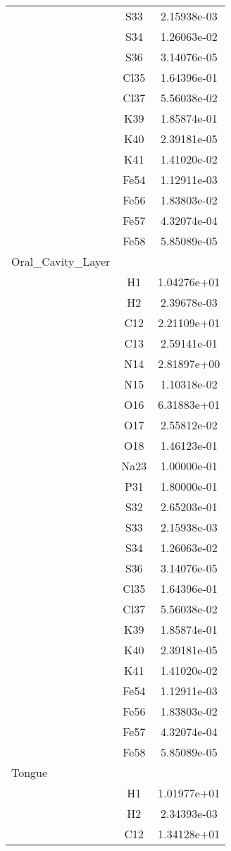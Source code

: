 \begin{centering}
\begin{longtable}{l c c}
& S33 & 2.15938e-03 \\ 
& S34 & 1.26063e-02 \\ 
& S36 & 3.14076e-05 \\ 
& Cl35 & 1.64396e-01 \\ 
& Cl37 & 5.56038e-02 \\ 
& K39 & 1.85874e-01 \\ 
& K40 & 2.39181e-05 \\ 
& K41 & 1.41020e-02 \\ 
& Fe54 & 1.12911e-03 \\ 
& Fe56 & 1.83803e-02 \\ 
& Fe57 & 4.32074e-04 \\ 
& Fe58 & 5.85089e-05 \\ 
\hline
Oral\_Cavity\_Layer & & \\
\hline
& H1 & 1.04276e+01 \\ 
& H2 & 2.39678e-03 \\ 
& C12 & 2.21109e+01 \\ 
& C13 & 2.59141e-01 \\ 
& N14 & 2.81897e+00 \\ 
& N15 & 1.10318e-02 \\ 
& O16 & 6.31883e+01 \\ 
& O17 & 2.55812e-02 \\ 
& O18 & 1.46123e-01 \\ 
& Na23 & 1.00000e-01 \\ 
& P31 & 1.80000e-01 \\ 
& S32 & 2.65203e-01 \\ 
& S33 & 2.15938e-03 \\ 
& S34 & 1.26063e-02 \\ 
& S36 & 3.14076e-05 \\ 
& Cl35 & 1.64396e-01 \\ 
& Cl37 & 5.56038e-02 \\ 
& K39 & 1.85874e-01 \\ 
& K40 & 2.39181e-05 \\ 
& K41 & 1.41020e-02 \\ 
& Fe54 & 1.12911e-03 \\ 
& Fe56 & 1.83803e-02 \\ 
& Fe57 & 4.32074e-04 \\ 
& Fe58 & 5.85089e-05 \\ 
\hline
Tongue & & \\
\hline
& H1 & 1.01977e+01 \\ 
& H2 & 2.34393e-03 \\ 
& C12 & 1.34128e+01 \\ 

\end{longtable}
\end{centering}
